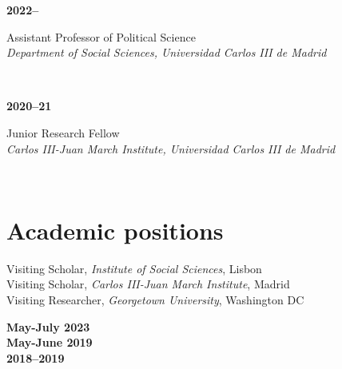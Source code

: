 \documentclass[a4paper, 12pt]{article}
\begin{document}
\begin{minipage}[t]{0.12\textwidth}
\textbf{2022--}
\end{minipage}\hfill\begin{minipage}[t]{0.88\textwidth}
Assistant Professor of Political Science\\
\textit{Department of Social Sciences, Universidad Carlos III de Madrid}\\\vspace{-8pt}
\end{minipage}\\
\begin{minipage}[t]{0.12\textwidth}
\textbf{2020--21}
\end{minipage}\hfill\begin{minipage}[t]{0.88\textwidth}
Junior Research Fellow\\
\textit{Carlos III-Juan March Institute, Universidad Carlos III de Madrid}\\\vspace{-8pt}
\end{minipage}\\

\vspace{-10pt}
\section*{Academic positions}

\begin{minipage}[t]{0.82\textwidth}
  Visiting Scholar, \textit{Institute of Social Sciences}, Lisbon\vspace{2pt}\\
  Visiting Scholar, \textit{Carlos III-Juan March Institute}, Madrid\vspace{2pt}\\
	Visiting Researcher, \textit{Georgetown University}, Washington DC
\end{minipage}
\begin{minipage}[t]{0.18\textwidth}
  \flushright
	\textbf{May-July 2023}\\\vspace{7pt}
  \textbf{May-June 2019}\\\vspace{7pt}
	\textbf{2018--2019}
\end{minipage}
\end{document}
